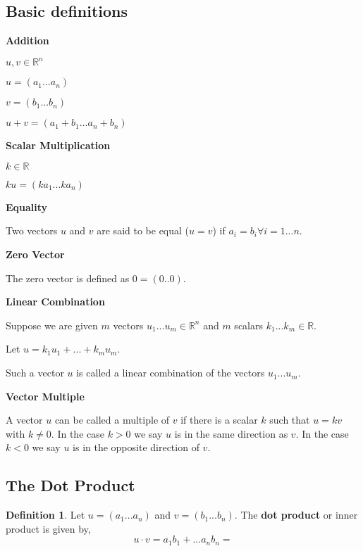\documentclass{report}
\theoremstyle{definition}
\newtheorem{_def}{Definition}
\begin{document}
\subsection{Basic definitions}

\textbf{Addition}

\(u, v \in \mathbb{R}^n\)

\(u=(a_1...a_n)\) 

\(v=(b_1...b_n)\)

\(u+v=(a_1+b_1...a_n+b_n)\) \newline

\textbf{Scalar Multiplication}

\(k\in \mathbb{R}\)

\(ku=(ka_1...ka_n)\) \newline

\textbf{Equality}

Two vectors \(u\) and \(v\) are said to be equal (\(u=v\)) if \(a_i=b_i \forall i=1...n\). \newline

\textbf{Zero Vector}

The zero vector is defined as \(0=(0..0)\). \newline

\textbf{Linear Combination}

Suppose we are given \(m\) vectors \(u_1...u_m\in \mathbb{R}^n\) and \(m\) scalars \(k_1...k_m\in \mathbb{R}\).

Let \(u=k_1u_1+...+k_mu_m\).

Such a vector \(u\) is called a linear combination of the vectors \(u_1...u_m\). \newline

\textbf{Vector Multiple}

A vector \(u\) can be called a multiple of \(v\) if there is a scalar \(k\) such that \(u=kv\) with \(k\neq 0\). 
In the case \(k>0\) we say \(u\) is in the same direction as \(v\). 
In the case \(k<0\) we say \(u\) is in the opposite direction of \(v\). \newline

\subsection{The Dot Product}

\begin{_def}
Let \(u=(a_1...a_n)\) and \(v=(b_1...b_n)\). The \textbf{dot product} or inner product is given by,
\[u\cdot v=a_1b_1+...a_nb_n=\]
\end{_def}
\end{document}
